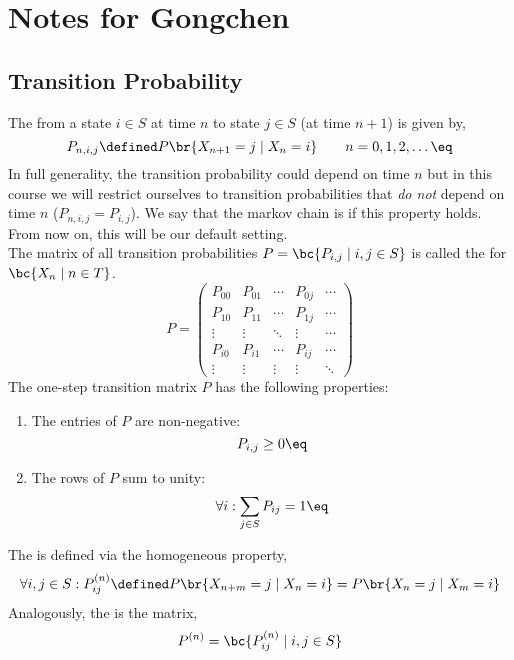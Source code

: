 \documentclass{article}
\begin{document}
\section{Notes for Gongchen}
\subsection{Transition Probability}

The  from a state $i \in S$ at time $n$ to state $j \in S$ (at time $n+1$) is given by,
\[ P_{n, i, j} \defined P \br{X_{n+1}= j \mid X_{n} = i} \qquad n = 0, 1, 2, \ldots \eq \label{eq:trans_prob}\]
In full generality, the transition probability could depend on time $n$ but in this course we will restrict ourselves to transition probabilities that \textit{do not} depend on time $n$ ($P_{n, i, j} = P_{i, j}$). We say that the markov chain is  if this property holds. From now on, this will be our default setting. \\

The matrix of all transition probabilities $P = \bc{P_{i,j} \mid i,j \in S}$ is called the  for $\bc{X_{n} \mid n \in T}$.
\[ P = \begin{pmatrix}
P_{00} & P_{01} & \cdots & P_{0j} & \cdots \\
P_{10} & P_{11} & \cdots & P_{1j} & \cdots \\
\vdots & \vdots & \ddots & \vdots & \cdots \\
P_{i0} & P_{i1} & \cdots & P_{ij} & \cdots \\
\vdots & \vdots & \vdots & \vdots & \ddots
\end{pmatrix} \]
The one-step transition matrix $P$ has the following properties:
\begin{enumerate}
    \item The entries of $P$ are non-negative:
    \[ P_{i,j} \geq 0 \eq \label{eq:trans_positive_entries} \]
    \item The rows of $P$ sum to unity:
    \[ \forall i : \sum_{j \in S} P_{ij} = 1 \eq \label{eq:trans_row_sum} \]
\end{enumerate}

The  is defined via the homogeneous property,
\[ \forall i,j \in S : P_{ij}^{(n)} \defined P\br{X_{n+m} = j \mid X_{n} = i} = P\br{X_{n} = j \mid X_{m} = i} \]
Analogously, the  is the matrix,
\[ P^{(n)} = \bc{P_{ij}^{(n)} \mid i, j \in S} \]
\end{document}
